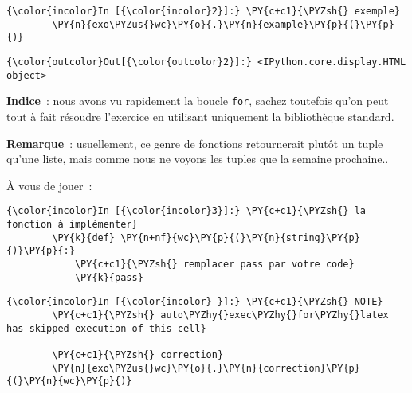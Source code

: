     \begin{Verbatim}[commandchars=\\\{\}]
{\color{incolor}In [{\color{incolor}2}]:} \PY{c+c1}{\PYZsh{} exemple}
        \PY{n}{exo\PYZus{}wc}\PY{o}{.}\PY{n}{example}\PY{p}{(}\PY{p}{)}
\end{Verbatim}


\begin{Verbatim}[commandchars=\\\{\}]
{\color{outcolor}Out[{\color{outcolor}2}]:} <IPython.core.display.HTML object>
\end{Verbatim}
            
    \textbf{Indice}~: nous avons vu rapidement la boucle \texttt{for},
sachez toutefois qu'on peut tout à fait résoudre l'exercice en utilisant
uniquement la bibliothèque standard.

\textbf{Remarque}~: usuellement, ce genre de fonctions retournerait
plutôt un tuple qu'une liste, mais comme nous ne voyons les tuples que
la semaine prochaine..

    À vous de jouer~:

    \begin{Verbatim}[commandchars=\\\{\}]
{\color{incolor}In [{\color{incolor}3}]:} \PY{c+c1}{\PYZsh{} la fonction à implémenter}
        \PY{k}{def} \PY{n+nf}{wc}\PY{p}{(}\PY{n}{string}\PY{p}{)}\PY{p}{:}
            \PY{c+c1}{\PYZsh{} remplacer pass par votre code}
            \PY{k}{pass}
\end{Verbatim}


    \begin{Verbatim}[commandchars=\\\{\}]
{\color{incolor}In [{\color{incolor} }]:} \PY{c+c1}{\PYZsh{} NOTE}
        \PY{c+c1}{\PYZsh{} auto\PYZhy{}exec\PYZhy{}for\PYZhy{}latex has skipped execution of this cell}
        
        \PY{c+c1}{\PYZsh{} correction}
        \PY{n}{exo\PYZus{}wc}\PY{o}{.}\PY{n}{correction}\PY{p}{(}\PY{n}{wc}\PY{p}{)}
\end{Verbatim}



    
    
    
